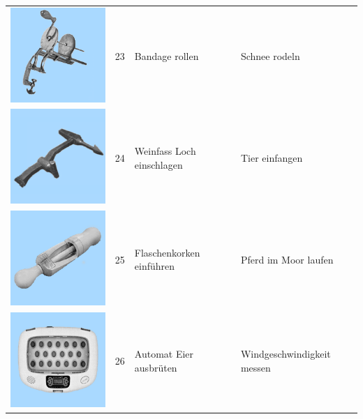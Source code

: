 \documentclass[
  english,
  man,floatsintext]{apa7}
\begin{document}
\begin{center}
\begin{ThreePartTable}
\begin{longtable}{llll}
\includegraphics[valign=c, scale=0.19]{../materials/unfamiliar/23.png} & 23 & Bandage rollen & Schnee rodeln\\
\includegraphics[valign=c, scale=0.19]{../materials/unfamiliar/24.png} & 24 & Weinfass Loch einschlagen & Tier einfangen\\
\includegraphics[valign=c, scale=0.19]{../materials/unfamiliar/25.png} & 25 & Flaschenkorken einführen & Pferd im Moor laufen\\
\includegraphics[valign=c, scale=0.19]{../materials/unfamiliar/26.png} & 26 & Automat Eier ausbrüten & Windgeschwindigkeit messen\\

\end{longtable}
\end{ThreePartTable}
\end{center}
\end{document}
